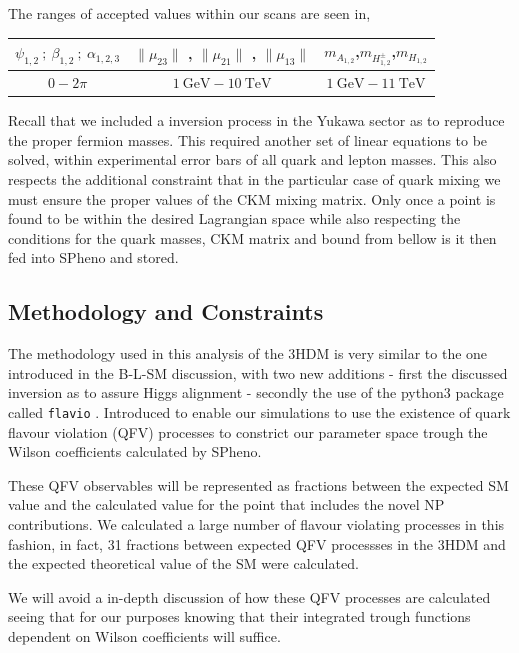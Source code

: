 The ranges of accepted values within our scans are seen in,
%
\begin{table}[H]
\centering
\begin{tabular}{ccc}
$\psi_{1,2} \ ; \ \beta_{1,2} \ ;\  \alpha_{1,2,3}$ & $\|\mu_{23}\|$ , $\|\mu_{21}\|$ , $\|\mu_{13}\|$ &  $m_{A_{1,2}}$,$m_{H_{1,2}^\pm}$,$m_{H_{1,2}}$ \\ \hline
$0- 2\pi$    & $1 \ \text{GeV} - 10 \ \text{TeV}$ & $1 \ \text{GeV} - 11 \ \text{TeV}$   
\end{tabular}
\end{table}

Recall that we included a inversion process in the Yukawa sector as to reproduce the proper fermion masses. 
% 
This required another set of linear equations to be solved, within experimental error bars of all quark and lepton masses.
% 
This also respects the additional constraint that in the particular case of quark mixing we must ensure the proper values of the CKM mixing matrix.  
%
Only once a point is found to be within the desired Lagrangian space while also respecting the conditions for the quark masses, CKM matrix and bound from bellow is it then fed into SPheno and stored. 
%
\subsection{Methodology and Constraints}

The  methodology used in this analysis of the 3HDM is very similar to the one introduced in the B-L-SM discussion, with two new additions - first the discussed inversion as to assure Higgs alignment - secondly the use of the python3 package called \texttt{flavio}  \cite{straub2018flavio}. 
%
Introduced to enable our simulations to use the existence of quark flavour violation (QFV) processes to constrict our parameter space trough the Wilson coefficients calculated by SPheno. 

These QFV observables will be represented as fractions between the expected SM value and the calculated value for the point that includes the novel NP contributions. 
%
We calculated a large number of flavour violating processes in this fashion, in fact, 31 fractions between expected QFV processses in the 3HDM and the expected theoretical value of the SM were calculated. 
%

We will avoid a in-depth discussion of how these QFV processes are calculated seeing that for our purposes knowing that their integrated trough functions dependent on Wilson coefficients will suffice. %

